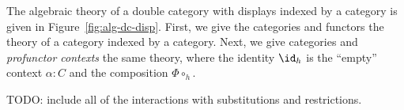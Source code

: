 The algebraic theory of a double category with displays indexed by a
category is given in Figure~\ref{fig:alg-dc-disp}.
%
First, we give the categories and functors the theory of a category
indexed by a category.
%
Next, we give categories and \emph{profunctor contexts} the same
theory, where the identity $\id_h$ is the ``empty'' context $\alpha:C$ and the composition $\Phi \circ_h$.
%

TODO: include all of the interactions with substitutions and restrictions.

\begin{figure}
\end{figure}

